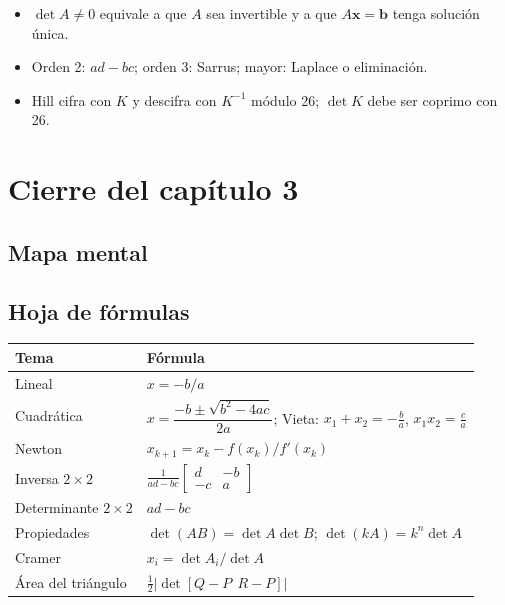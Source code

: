 
\begin{tmresumen}
\begin{itemize}
\item $\det A\neq0$ equivale a que $A$ sea invertible y a que $A\mathbf x=\mathbf b$ tenga soluci\'on \'unica.
\item Orden 2: $ad-bc$; orden 3: Sarrus; mayor: Laplace o eliminaci\'on.
\item Hill cifra con $K$ y descifra con $K^{-1}$ m\'odulo 26; $\det K$ debe ser coprimo con 26.
\end{itemize}
\end{tmresumen}

\clearpage
\section*{Cierre del cap\'itulo 3}
\subsection{Mapa mental}

\subsection{Hoja de f\'ormulas}
\begin{center}
\begin{tabular}{|p{4.2cm}|p{8.4cm}|}
\hline
\rowcolor{tmAzulClaro}\textbf{Tema} & \textbf{F\'ormula}\\ \hline
Lineal & $x=-b/a$\\ \hline
Cuadr\'atica & $x=\dfrac{-b\pm\sqrt{b^2-4ac}}{2a}$; Vieta: $x_1+x_2=-\frac ba$, $x_1x_2=\frac ca$\\ \hline
Newton & $x_{k+1}=x_k-f(x_k)/f'(x_k)$\\ \hline
Inversa $2\times2$ & $\frac{1}{ad-bc}\begin{bmatrix}d&-b\\-c&a\end{bmatrix}$\\ \hline
Determinante $2\times2$ & $ad-bc$\\ \hline
Propiedades & $\det(AB)=\det A\det B$; $\det(kA)=k^n\det A$\\ \hline
Cramer & $x_i=\det A_i/\det A$\\ \hline
\'Area del tri\'angulo & $\frac12|\det[Q-P\ \ R-P]|$\\ \hline
\end{tabular}
\end{center}

